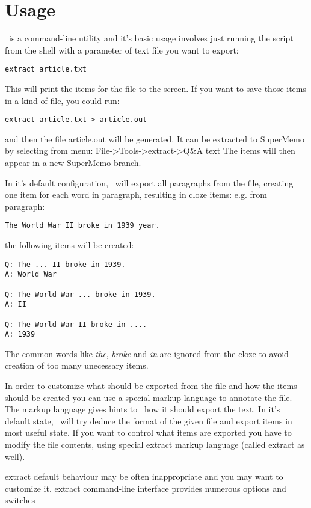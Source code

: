 \documentclass[a4paper,11pt]{article}
\newcommand{\probe}{\emph{\sc{probe{}}}}
\begin{document}
\section{Usage}

\probe\ is a command-line utility and it's basic usage involves just running the
script from the shell with a parameter of text file you want to export:
\begin{verbatim}
extract article.txt
\end{verbatim}

This will print the items for the file to the screen. If you want to save those
items in a kind of file, you could run:
\begin{verbatim}
extract article.txt > article.out
\end{verbatim}
and then the file article.out will be generated.
It can be extracted to SuperMemo by selecting from menu:
File->Tools->extract->Q\&A text
The items will then appear in a new SuperMemo branch.


In it's default configuration, \probe\ will export all paragraphs from the
file, creating one item for each word in paragraph, resulting in cloze
items:
e.g. from paragraph:
\begin{verbatim}
The World War II broke in 1939 year.
\end{verbatim}
the following items will be created:

\begin{verbatim}
Q: The ... II broke in 1939.
A: World War

Q: The World War ... broke in 1939.
A: II

Q: The World War II broke in ....
A: 1939
\end{verbatim}

The common words like \textit{the}, \textit{broke} and \textit{in} are ignored
from the cloze to avoid creation of too many unecessary items.

In order to customize what should be exported from the file and how the
items should be created you can use a special markup language to annotate the
file.  The markup language gives hints to \probe\ how it should export the
text.
In it's default state, \probe\ will try deduce the format of the given file
and export items in most useful state. If you want to control what items are
exported you have to modify the file contents, using special extract markup
language (called extract as well).


extract default behaviour may be often inappropriate and you may want to
customize it. extract command-line interface provides numerous options and switches
\end{document}
